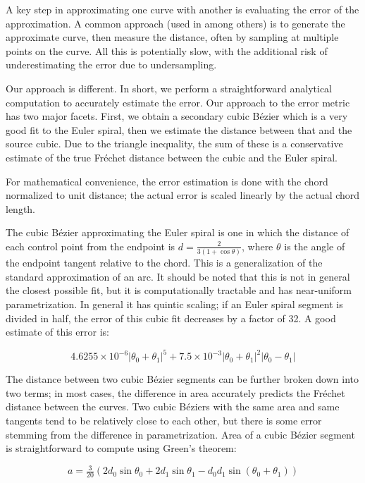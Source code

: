 \documentclass[sigconf, nonacm]{acmart}
\begin{document}
A key step in approximating one curve with another is evaluating the error of the approximation. A common approach (used in \citet{Nehab2020} among others) is to generate the approximate curve, then measure the distance, often by sampling at multiple points on the curve. All this is potentially slow, with the additional risk of underestimating the error due to undersampling.

Our approach is different. In short, we perform a straightforward analytical computation to accurately estimate the error. Our approach to the error metric has two major facets. First, we obtain a secondary cubic Bézier which is a very good fit to the Euler spiral, then we estimate the distance between that and the source cubic. Due to the triangle inequality, the sum of these is a conservative estimate of the true Fréchet distance between the cubic and the Euler spiral.

For mathematical convenience, the error estimation is done with the chord normalized to unit distance; the actual error is scaled linearly by the actual chord length.

The cubic Bézier approximating the Euler spiral is one in which the distance of each control point from the endpoint is $d = \frac{2}{3(1 + \cos \theta)}$, where $\theta$ is the angle of the endpoint tangent relative to the chord. This is a generalization of the standard approximation of an arc. It should be noted that this is not in general the closest possible fit, but it is computationally tractable and has near-uniform parametrization. In general it has quintic scaling; if an Euler spiral segment is divided in half, the error of this cubic fit decreases by a factor of 32. A good estimate of this error is:

\[
    4.6255\times10^{-6}|\theta_0+\theta_1|^5 + 7.5\times10^{-3}|\theta_0+\theta_1|^2|\theta_0-\theta_1|
\]



The distance between two cubic Bézier segments can be further broken down into two terms; in most cases, the difference in area accurately predicts the Fréchet distance between the curves. Two cubic Béziers with the same area and same tangents tend to be relatively close to each other, but there is some error stemming from the difference in parametrization. Area of a cubic Bézier segment is straightforward to compute using Green's theorem:

\[
    a = \tfrac{3}{20}(2d_0\sin \theta_0 + 2d_1\sin \theta_1 - d_0 d_1\sin(\theta_0+\theta_1))
\]
\end{document}
